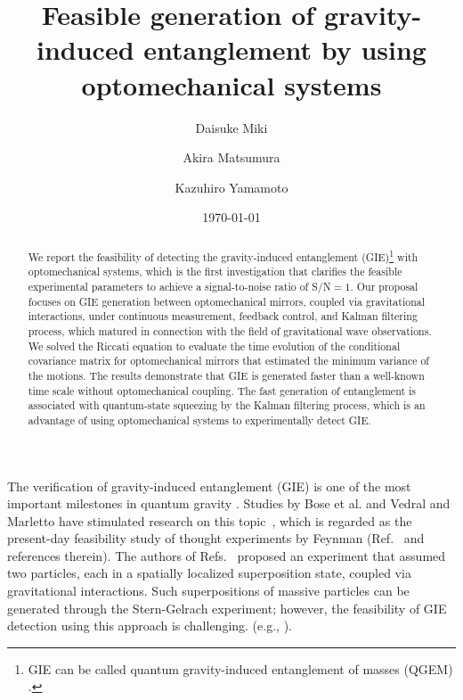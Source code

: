 \documentclass[twocolumn,superscriptaddress,aps,preprintnumbers,amsmath,amssymb,prl,nofootinbib]{revtex4}
\begin{document}
\title{
Feasible generation of gravity-induced entanglement 
by using optomechanical systems
}

\author{Daisuke Miki}

\author{Akira Matsumura}

\author{Kazuhiro Yamamoto}

\date{\today}
\begin{abstract}
We report the feasibility of detecting the gravity-induced entanglement (GIE)\footnote{GIE can be called quantum gravity-induced entanglement of masses (QGEM) \cite{Thomas,Tilly,Schut}.} with optomechanical systems, which is the first investigation that clarifies the feasible experimental parameters to achieve a signal-to-noise ratio of S/N$=1$. 
Our proposal focuses on GIE generation between optomechanical mirrors,
coupled via gravitational interactions, under continuous measurement, feedback control, and Kalman filtering process, which matured in connection with the field of gravitational wave observations.
We solved the Riccati equation to evaluate the time evolution of the conditional covariance matrix for optomechanical mirrors that estimated the minimum variance of the motions. 
The results demonstrate that GIE is generated faster than a well-known time scale without optomechanical coupling. The fast generation of entanglement is associated with quantum-state squeezing by the Kalman filtering process, which is an advantage of using optomechanical systems to experimentally detect GIE.
\end{abstract}
\maketitle


The verification of gravity-induced entanglement (GIE) is one of the most important milestones in quantum gravity \cite{Bose,Marletto,Krisnanda23,Howl}. Studies by Bose et al. and Vedral and Marletto have stimulated research on
this topic~\cite{Bose,Marletto}, which is regarded as the present-day feasibility study of thought experiments by Feynman (Ref.~\cite{Aspelmeyer2022} and references therein). The authors of Refs.~\cite{Bose,Marletto} proposed an experiment that assumed two particles, each in a spatially localized superposition state, coupled via gravitational interactions.
Such superpositions of massive particles can be generated through the Stern-Gelrach experiment; however, the feasibility of GIE detection using this approach is challenging.
 (e.g., \cite{Wood}). 
\end{document}
